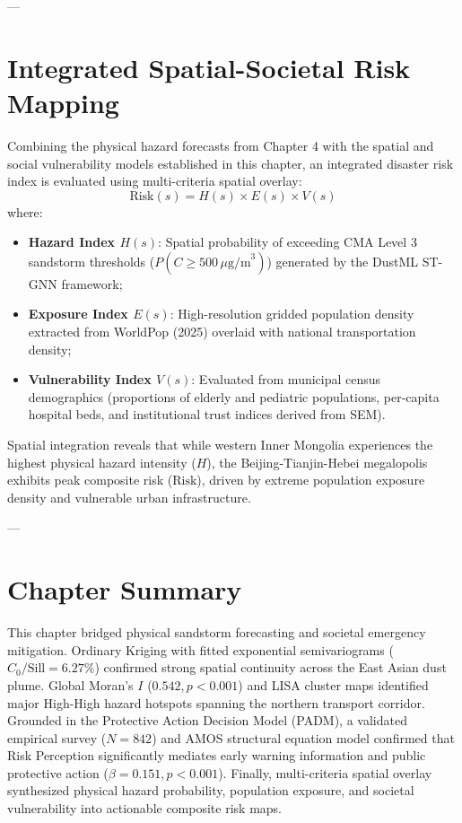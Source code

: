 ---

\section{Integrated Spatial-Societal Risk Mapping}
\label{sec:integrated_risk}

Combining the physical hazard forecasts from Chapter 4 with the spatial and social vulnerability models established in this chapter, an integrated disaster risk index is evaluated using multi-criteria spatial overlay:
\begin{equation}
\label{eq:disaster_risk_formula}
\text{Risk}(s) = H(s) \times E(s) \times V(s)
\end{equation}
where:
\begin{itemize}
    \item \textbf{Hazard Index $H(s)$}: Spatial probability of exceeding CMA Level 3 sandstorm thresholds ($P(C \ge 500\,\mu\text{g/m}^3)$) generated by the DustML ST-GNN framework;
    \item \textbf{Exposure Index $E(s)$}: High-resolution gridded population density extracted from WorldPop (2025) overlaid with national transportation density;
    \item \textbf{Vulnerability Index $V(s)$}: Evaluated from municipal census demographics (proportions of elderly and pediatric populations, per-capita hospital beds, and institutional trust indices derived from SEM).
\end{itemize}

Spatial integration reveals that while western Inner Mongolia experiences the highest physical hazard intensity ($H$), the Beijing-Tianjin-Hebei megalopolis exhibits peak composite risk ($\text{Risk}$), driven by extreme population exposure density and vulnerable urban infrastructure.

---

\section{Chapter Summary}
\label{sec:ch5_summary}

This chapter bridged physical sandstorm forecasting and societal emergency mitigation. Ordinary Kriging with fitted exponential semivariograms ($C_0 / \text{Sill} = 6.27\%$) confirmed strong spatial continuity across the East Asian dust plume. Global Moran's $I$ ($0.542, p < 0.001$) and LISA cluster maps identified major High-High hazard hotspots spanning the northern transport corridor. Grounded in the Protective Action Decision Model (PADM), a validated empirical survey ($N=842$) and AMOS structural equation model confirmed that Risk Perception significantly mediates early warning information and public protective action ($\beta = 0.151, p < 0.001$). Finally, multi-criteria spatial overlay synthesized physical hazard probability, population exposure, and societal vulnerability into actionable composite risk maps.
